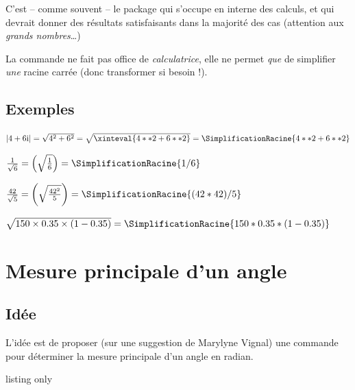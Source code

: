 \documentclass[a4paper,french,11pt]{article}
\newcommand\ctex[1]{\tcbox[vignettelatex]{#1}}
\newcommand\cmaj[1]{%
	{\tcbox[vignetteMaJ]{#1}\xspace}%
}
\begin{document}
\begin{noteblock}
C'est -- comme souvent -- le package \ctex{xint} qui s'occupe en interne des calculs, et qui devrait donner des résultats satisfaisants dans la majorité des cas (attention aux \textit{grands nombres}\ldots)

\smallskip

La commande ne fait pas office de \textit{calculatrice}, elle ne permet \textit{que} de simplifier \textit{une} racine carrée (donc transformer si besoin !).
\end{noteblock}

\subsection{Exemples}

\begin{PresCodePL}{}
$\left| 4+6\text{i}\right| = \sqrt{4^2+6^2} = \sqrt{\xinteval{4**2+6**2}}=\SimplificationRacine{4**2+6**2}$

$\frac{1}{\sqrt{6}}=\left(\sqrt{\frac{1}{6}}\right)=\SimplificationRacine{1/6}$

$\frac{42}{\sqrt{5}}=\left(\sqrt{\frac{42^2}{5}}\right)=\SimplificationRacine{(42*42)/5}$

$\sqrt{\num{150}\times\num{0.35}\times(1-\num{0.35})} = \displaystyle\SimplificationRacine{150*0.35*(1-0.35)}$
\end{PresCodePL}

\newpage

\section{Mesure principale d'un angle}\label{mesureprincipale}

\subsection{Idée}

\begin{tipblock}
\cmaj{2.1.2} L'idée est de proposer (sur une suggestion de Marylyne Vignal) une commande pour déterminer la mesure principale d'un angle en radian.
\end{tipblock}

\begin{PresCodeTexPL}{listing only}
\end{PresCodeTexPL}
\end{document}

